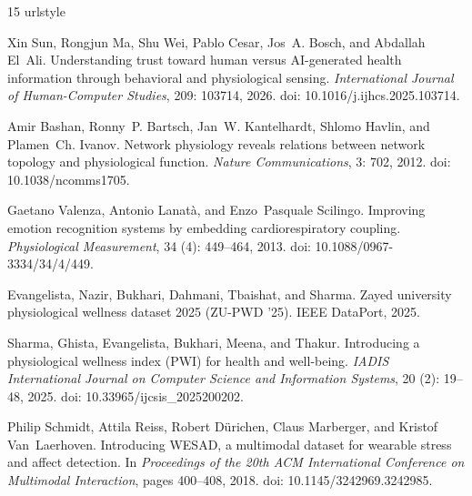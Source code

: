 \documentclass{article}
\begin{document}
\begin{thebibliography}{15}
\providecommand{\natexlab}[1]{#1}
\providecommand{\url}[1]{\texttt{#1}}
\expandafter\ifx\csname urlstyle\endcsname\relax
  \providecommand{\doi}[1]{doi: #1}\else
  \providecommand{\doi}{doi: \begingroup \urlstyle{rm}\Url}\fi

Xin Sun, Rongjun Ma, Shu Wei, Pablo Cesar, Jos~A. Bosch, and Abdallah El~Ali.
\newblock Understanding trust toward human versus {AI}-generated health
  information through behavioral and physiological sensing.
\newblock \emph{International Journal of Human-Computer Studies}, 209:
  103714, 2026.
\newblock \doi{10.1016/j.ijhcs.2025.103714}.

Amir Bashan, Ronny~P. Bartsch, Jan~W. Kantelhardt, Shlomo Havlin, and
  Plamen~Ch. Ivanov.
\newblock Network physiology reveals relations between network topology and
  physiological function.
\newblock \emph{Nature Communications}, 3: 702, 2012.
\newblock \doi{10.1038/ncomms1705}.

Gaetano Valenza, Antonio Lanat{\`a}, and Enzo~Pasquale Scilingo.
\newblock Improving emotion recognition systems by embedding cardiorespiratory
  coupling.
\newblock \emph{Physiological Measurement}, 34 (4): 449--464,
  2013.
\newblock \doi{10.1088/0967-3334/34/4/449}.

Evangelista, Nazir, Bukhari, Dahmani, Tbaishat, and Sharma.
\newblock Zayed university physiological wellness dataset 2025 ({ZU-PWD} '25).
\newblock IEEE DataPort, 2025.

Sharma, Ghista, Evangelista, Bukhari, Meena, and Thakur.
\newblock Introducing a physiological wellness index ({PWI}) for health and
  well-being.
\newblock \emph{IADIS International Journal on Computer Science and Information
  Systems}, 20 (2): 19--48, 2025.
\newblock \doi{10.33965/ijcsis_2025200202}.

Philip Schmidt, Attila Reiss, Robert D{\"u}richen, Claus Marberger, and Kristof
  Van~Laerhoven.
\newblock Introducing {WESAD}, a multimodal dataset for wearable stress and
  affect detection.
\newblock In \emph{Proceedings of the 20th ACM International Conference on
  Multimodal Interaction}, pages 400--408, 2018.
\newblock \doi{10.1145/3242969.3242985}.


\end{thebibliography}
\end{document}

